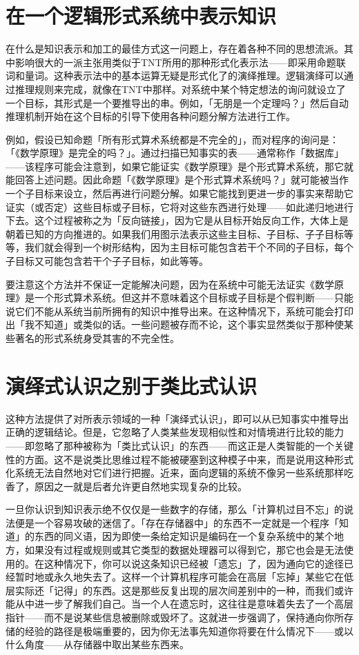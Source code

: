 \documentclass[
  12pt,
  twoside,
  openright,
  oldfontcommands,
]{memoir}
\begin{document}
\section{在一个逻辑形式系统中表示知识}

在什么是知识表示和加工的最佳方式这一问题上，存在着各种不同的思想流派。其中影响很大的一派主张用类似于TNT所用的那种形式化表示法------即采用命题联词和量词。这种表示法中的基本运算无疑是形式化了的演绎推理。逻辑演绎可以通过推理规则来完成，就像在TNT中那样。对系统中某个特定想法的询问就设立了一个目标，其形式是一个要推导出的串。例如，「无朋是一个定理吗？」然后自动推理机制开始在这个目标的引导下使用各种问题分解方法进行工作。

例如，假设已知命题「所有形式算术系统都是不完全的」，而对程序的询问是：「《数学原理》是完全的吗？」。通过扫描已知事实的表------通常称作「数据库」------该程序可能会注意到，如果它能证实《数学原理》是个形式算术系统，那它就能回答上述问题。因此命题「《数学原理》是个形式算术系统吗？」就可能被当作一个子目标来设立，然后再进行问题分解。如果它能找到更进一步的事实来帮助它证实（或否定）这些目标或子目标，它将对这些东西进行处理------如此递归地进行下去。这个过程被称之为「反向链接」，因为它是从目标开始反向工作，大体上是朝着已知的方向推进的。如果我们用图示法表示这些主目标、子目标、子子目标等等，我们就会得到一个树形结构，因为主目标可能包含若干个不同的子目标，每个子目标又可能包含若干个子子目标，如此等等。

要注意这个方法并不保证一定能解决问题，因为在系统中可能无法证实《数学原理》是一个形式算术系统。但这并不意味着这个目标或子目标是个假判断------只能说它们不能从系统当前所拥有的知识中推导出来。在这种情况下，系统可能会打印出「我不知道」或类似的话。一些问题被存而不论，这个事实显然类似于那种使某些著名的形式系统身受其害的不完全性。

\section{演绎式认识之别于类比式认识}

这种方法提供了对所表示领域的一种「演绎式认识」，即可以从已知事实中推导出正确的逻辑结论。但是，它忽略了人类某些发现相似性和对情境进行比较的能力------即忽略了那种被称为「类比式认识」的东西------而这正是人类智能的一个关键性的方面。这不是说类比思维过程不能被硬塞到这种模子中来，而是说用这种形式化系统无法自然地对它们进行把握。近来，面向逻辑的系统不像另一些系统那样吃香了，原因之一就是后者允许更自然地实现复杂的比较。

一旦你认识到知识表示绝不仅仅是一些数字的存储，那么「计算机过目不忘」的说法便是一个容易攻破的迷信了。「存在存储器中」的东西不一定就是一个程序「知道」的东西的同义语，因为即使一条给定知识是编码在一个复杂系统中的某个地方，如果没有过程或规则或其它类型的数据处理器可以得到它，那它也会是无法使用的。在这种情况下，你可以说这条知识已经被「遗忘」了，因为通向它的途径已经暂时地或永久地失去了。这样一个计算机程序可能会在高层「忘掉」某些它在低层实际还「记得」的东西。这是那些反复出现的层次间差别中的一种，而我们或许能从中进一步了解我们自己。当一个人在遗忘时，这往往是意味着失去了一个高层指针------而不是说某些信息被删除或毁坏了。这就进一步强调了，保持通向你所存储的经验的路径是极端重要的，因为你无法事先知道你将要在什么情况下------或以什么角度------从存储器中取出某些东西来。
\end{document}
